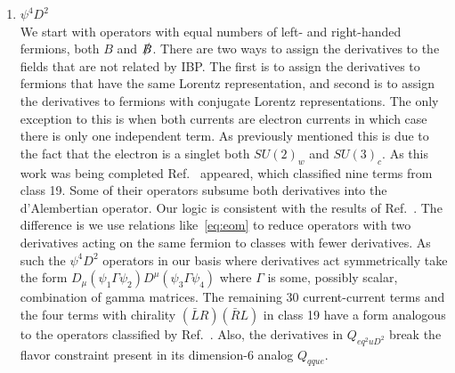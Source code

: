 \begin{enumerate}
The other possibility is that only three of the fermion fields are unique, \textit{e.g.} $\bar d, d, \bar q, d$.
In this case there is only one way to contract the Lorentz indices when the derivative acts on the Higgs field, and only two possible ways to assign the derivative to fermions.
When the derivative acts on the Higgs field or the repeated fermion there are four, two, and one possible gauge contractions when the repeated fermion is $q$, one of $\{l, u, d\}$, or $e$, respectively.
Instead when the derivative acts on the fermion is not repeated, \textit{e.g.} $\bar d, d, (D \bar q), d$, there are two possible gauge contractions if the repeated fermion is $q$ and only one otherwise.
Here the repeated fermion is in a symmetric Lorentz representation and so the gauge contractions must be antisymmetric, eliminating half the possibilities.

The baryon number violating operators follow the same rules.
There are a couple of non-trivial flavor cases.
When there are duplicate right-handed fermions they form a symmetric flavor representation if the derivative acts on the Higgs field, and have full flavor rank if the derivative acts on the one of the duplicate fermions.
For the term $Q_{eq^3HD}$, the derivative acts on one of the $q$ fields, breaking the flavor constrain, Eq.~\eqref{eq:qqql}, giving it full flavor rank.

\item $\psi^4D^2$ \\

We start with operators with equal numbers of left- and right-handed fermions, both $B$ and $\slashed B$.
There are two ways to assign the derivatives to the fields that are not related by IBP.
The first is to assign the derivatives to fermions that have the same Lorentz representation, and second is to assign the derivatives to fermions with conjugate Lorentz representations.
The only exception to this is when both currents are electron currents in which case there is only one independent term.
As previously mentioned this is due to the fact that the electron is a singlet both $SU(2)_w$ and $SU(3)_c$.
As this work was being completed Ref.~\cite{Alioli:2020kez} appeared, which classified nine terms from class 19.
Some of their operators subsume both derivatives into the d'Alembertian operator.
Our logic is consistent with the results of Ref.~\cite{Alioli:2020kez}.
The difference is we use relations like~\eqref{eq:eom} to reduce operators with two derivatives acting on the same fermion to classes with fewer derivatives.
As such the $\psi^4D^2$ operators in our basis where derivatives act symmetrically take the form $D_\mu (\psi_1 \Gamma \psi_2) D^\mu (\psi_3 \Gamma \psi_4)$ where $\Gamma$ is some, possibly scalar, combination of gamma matrices. 
The remaining 30 current-current terms and the four terms with chirality $(\bar L R) (\bar R L)$ in class 19 have a form analogous to the operators classified by Ref.~\cite{Alioli:2020kez}.
Also, the derivatives in $Q_{eq^2uD^2}$ break the flavor constraint present in its dimension-6 analog $Q_{qque}$.


\end{enumerate}
